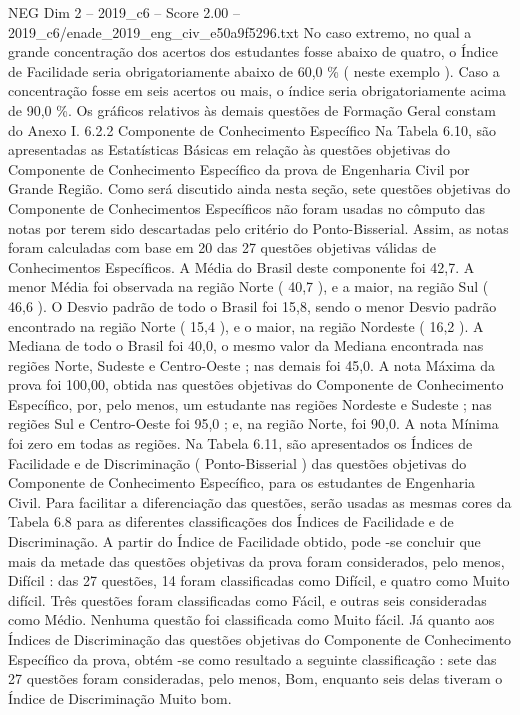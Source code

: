 \begin{textsample}{NEG Dim 2 – 2019\_c6 – Score 2.00 – 2019\_c6/enade\_2019\_eng\_civ\_e50a9f5296.txt}
No caso extremo, no qual a grande concentração dos acertos dos estudantes fosse abaixo de quatro, o Índice de Facilidade seria obrigatoriamente abaixo de 60,0 \% ( neste exemplo ).
Caso a concentração fosse em seis acertos ou mais, o índice seria obrigatoriamente acima de 90,0 \%.
Os gráficos relativos às demais questões de Formação Geral constam do Anexo I. 6.2.2 Componente de Conhecimento Específico Na Tabela 6.10, são apresentadas as Estatísticas Básicas em relação às questões objetivas do Componente de Conhecimento Específico da prova de Engenharia Civil por Grande Região.
Como será discutido ainda nesta seção, sete questões objetivas do Componente de Conhecimentos Específicos não foram usadas no cômputo das notas por terem sido descartadas pelo critério do Ponto-Bisserial.
Assim, as notas foram calculadas com base em 20 das 27 questões objetivas válidas de Conhecimentos Específicos.
A Média do Brasil deste componente foi 42,7.
A menor Média foi observada na região Norte ( 40,7 ), e a maior, na região Sul ( 46,6 ).
O Desvio padrão de todo o Brasil foi 15,8, sendo o menor Desvio padrão encontrado na região Norte ( 15,4 ), e o maior, na região Nordeste ( 16,2 ).
A Mediana de todo o Brasil foi 40,0, o mesmo valor da Mediana encontrada nas regiões Norte, Sudeste e Centro-Oeste ; nas demais foi 45,0.
A nota Máxima da prova foi 100,00, obtida nas questões objetivas do Componente de Conhecimento Específico, por, pelo menos, um estudante nas regiões Nordeste e Sudeste ; nas regiões Sul e Centro-Oeste foi 95,0 ; e, na região Norte, foi 90,0.
A nota Mínima foi zero em todas as regiões.
Na Tabela 6.11, são apresentados os Índices de Facilidade e de Discriminação ( Ponto-Bisserial ) das questões objetivas do Componente de Conhecimento Específico, para os estudantes de Engenharia Civil.
Para facilitar a diferenciação das questões, serão usadas as mesmas cores da Tabela 6.8 para as diferentes classificações dos Índices de Facilidade e de Discriminação.
A partir do Índice de Facilidade obtido, pode -se concluir que mais da metade das questões objetivas da prova foram considerados, pelo menos, Difícil : das 27 questões, 14 foram classificadas como Difícil, e quatro como Muito difícil.
Três questões foram classificadas como Fácil, e outras seis consideradas como Médio.
Nenhuma questão foi classificada como Muito fácil.
Já quanto aos Índices de Discriminação das questões objetivas do Componente de Conhecimento Específico da prova, obtém -se como resultado a seguinte classificação : sete das 27 questões foram consideradas, pelo menos, Bom, enquanto seis delas tiveram o Índice de Discriminação Muito bom.

\end{textsample}
